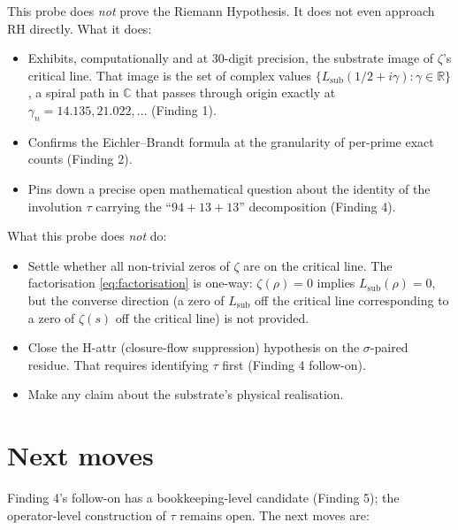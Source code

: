 \documentclass[11pt,a4paper]{article}
\newcommand{\R}{\mathbb{R}}
\newcommand{\C}{\mathbb{C}}
\newcommand{\Lsub}{L_{\mathrm{sub}}}
\begin{document}
\begin{scopebox}
This probe does \emph{not} prove the Riemann Hypothesis. It does
not even approach RH directly. What it does:

\begin{itemize}[leftmargin=*]
  \item Exhibits, computationally and at 30-digit precision, the
        substrate image of $\zeta$'s critical line. That image
        is the set of complex values
        $\{\Lsub(1/2 + i\gamma) : \gamma \in \R\}$, a spiral path
        in $\C$ that passes through origin exactly at
        $\gamma_n = 14.135, 21.022, \ldots$ (Finding 1).
  \item Confirms the Eichler--Brandt formula at the granularity of
        per-prime exact counts (Finding 2).
  \item Pins down a precise open mathematical question about the
        identity of the involution $\tau$ carrying the
        ``$94 + 13 + 13$'' decomposition (Finding 4).
\end{itemize}

What this probe does \emph{not} do:

\begin{itemize}[leftmargin=*]
  \item Settle whether all non-trivial zeros of $\zeta$ are on the
        critical line. The factorisation
        \eqref{eq:factorisation} is one-way: $\zeta(\rho) = 0$
        implies $\Lsub(\rho) = 0$, but the converse direction
        (a zero of $\Lsub$ off the critical line corresponding to
        a zero of $\zeta(s)$ off the critical line) is not
        provided.
  \item Close the H-attr (closure-flow suppression) hypothesis on
        the $\sigma$-paired residue. That requires identifying
        $\tau$ first (Finding 4 follow-on).
  \item Make any claim about the substrate's physical realisation.
\end{itemize}
\end{scopebox}

\section{Next moves}
\label{sec:next}

Finding 4's follow-on has a bookkeeping-level candidate
(Finding 5); the operator-level construction of $\tau$ remains
open. The next moves are:
\end{document}
